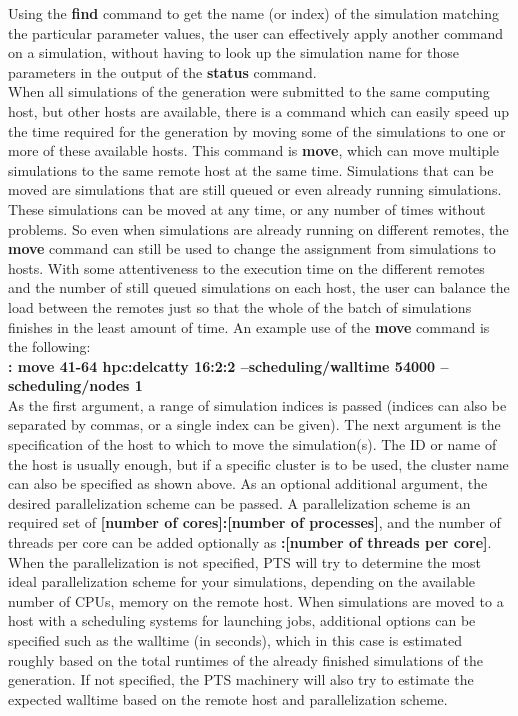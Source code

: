 \documentclass[15pt,a4paper,oneside,openright]{report}
\begin{document}
Using the \textbf{find} command to get the name (or index) of the simulation matching the particular parameter values, the user can effectively apply another command on a simulation, without having to look up the simulation name for those parameters in the output of the \textbf{status} command.\\

When all simulations of the generation were submitted to the same computing host, but other hosts are available, there is a command which can easily speed up the time required for the generation by moving some of the simulations to one or more of these available hosts. This command is \textbf{move}, which can move multiple simulations to the same remote host at the same time. Simulations that can be moved are simulations that are still queued or even already running simulations. These simulations can be moved at any time, or any number of times without problems. So even when simulations are already running on different remotes, the \textbf{move} command can still be used to change the assignment from simulations to hosts. With some attentiveness to the execution time on the different remotes and the number of still queued simulations on each host, the user can balance the load between the remotes just so that the whole of the batch of simulations finishes in the least amount of time. An example use of the \textbf{move} command is the following:\\

\textbf{: move 41-64 hpc:delcatty 16:2:2 --scheduling/walltime 54000 --scheduling/nodes 1}\\

As the first argument, a range of simulation indices is passed (indices can also be separated by commas, or a single index can be given). The next argument is the specification of the host to which to move the simulation(s). The ID or name of the host is usually enough, but if a specific cluster is to be used, the cluster name can also be specified as shown above. As an optional additional argument, the desired parallelization scheme can be passed. A parallelization scheme is an required set of \textbf{[number of cores]:[number of processes]}, and the number of threads per core can be added optionally as \textbf{:[number of threads per core]}. When the parallelization is not specified, PTS will try to determine the most ideal parallelization scheme for your simulations, depending on the available number of CPUs, memory on the remote host. When simulations are moved to a host with a scheduling systems for launching jobs, additional options can be specified such as the walltime (in seconds), which in this case is estimated roughly based on the total runtimes of the already finished simulations of the generation. If not specified, the PTS machinery will also try to estimate the expected walltime based on the remote host and parallelization scheme.\\
\end{document}
